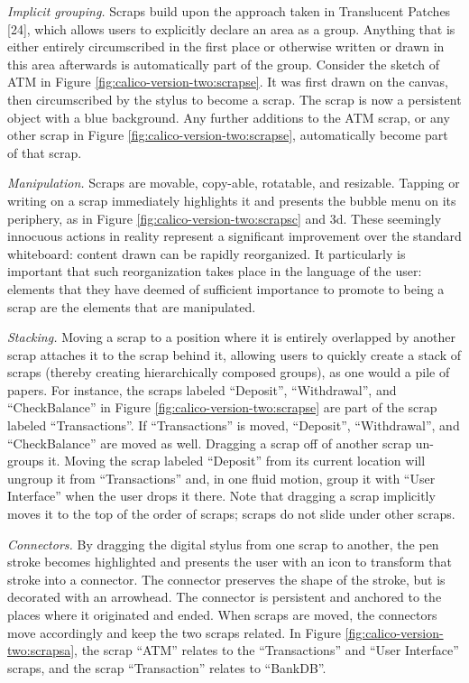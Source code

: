 \emph{Implicit grouping.} Scraps build upon the approach taken in Translucent Patches [24], which allows users to explicitly declare an area as a group. Anything that is either entirely circumscribed in the first place or otherwise written or drawn in this area afterwards is automatically part of the group. Consider the sketch of ATM in Figure \ref{fig:calico-version-two:scrapse}. It was first drawn on the canvas, then circumscribed by the stylus to become a scrap. The scrap is now a persistent object with a blue background. Any further additions to the ATM scrap, or any other scrap in Figure \ref{fig:calico-version-two:scrapse}, automatically become part of that scrap.

\emph{Manipulation.} Scraps are movable, copy-able, rotatable, and resizable. Tapping or writing on a scrap immediately highlights it and presents the bubble menu on its periphery, as in Figure \ref{fig:calico-version-two:scrapsc} and 3d. These seemingly innocuous actions in reality represent a significant improvement over the standard whiteboard: content drawn can be rapidly reorganized. It particularly is important that such reorganization takes place in the language of the user: elements that they have deemed of sufficient importance to promote to being a scrap are the elements that are manipulated.

\emph{Stacking.} Moving a scrap to a position where it is entirely overlapped by another scrap attaches it to the scrap behind it, allowing users to quickly create a stack of scraps (thereby creating hierarchically composed groups), as one would a pile of papers. For instance, the scraps labeled “Deposit'', ``Withdrawal'', and ``CheckBalance'' in Figure \ref{fig:calico-version-two:scrapse} are part of the scrap labeled ``Transactions''. If ``Transactions'' is moved, ``Deposit'', ``Withdrawal'', and ``CheckBalance'' are moved as well. Dragging a scrap off of another scrap un-groups it. Moving the scrap labeled ``Deposit'' from its current location will ungroup it from ``Transactions'' and, in one fluid motion, group it with ``User Interface'' when the user drops it there. Note that dragging a scrap implicitly moves it to the top of the order of scraps; scraps do not slide under other scraps.

\emph{Connectors.} By dragging the digital stylus from one scrap to another, the pen stroke becomes highlighted and presents the user with an icon to transform that stroke into a connector. The connector preserves the shape of the stroke, but is decorated with an arrowhead. The connector is persistent and anchored to the places where it originated and ended. When scraps are moved, the connectors move accordingly and keep the two scraps related. In Figure \ref{fig:calico-version-two:scrapsa}, the scrap ``ATM'' relates to the ``Transactions'' and ``User Interface'' scraps, and the scrap ``Transaction'' relates to ``BankDB''.

